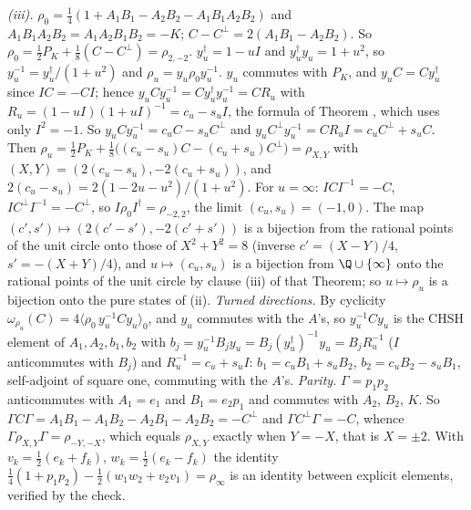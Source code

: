 \emph{(iii).} $\rho_{0} = \tfrac14(1 + A_{1}B_{1} - A_{2}B_{2} - A_{1}B_{1}A_{2}B_{2})$ and $A_{1}B_{1}A_{2}B_{2} = A_{1}A_{2}B_{1}B_{2} = -K$; $C - C^{\perp} = 2(A_{1}B_{1} - A_{2}B_{2})$. So $\rho_{0} = \tfrac12P_{K} + \tfrac18(C - C^{\perp}) = \rho_{2,-2}$. $y_{u}^{\dagger} = 1 - uI$ and $y_{u}^{\dagger}y_{u} = 1 + u^{2}$, so $y_{u}^{-1} = y_{u}^{\dagger}/(1 + u^{2})$ and $\rho_{u} = y_{u}\rho_{0}y_{u}^{-1}$. $y_{u}$ commutes with $P_{K}$, and $y_{u}C = Cy_{u}^{\dagger}$ since $IC = -CI$; hence $y_{u}Cy_{u}^{-1} = Cy_{u}^{\dagger}y_{u}^{-1} = CR_{u}$ with $R_{u} = (1 - uI)(1 + uI)^{-1} = c_{u} - s_{u}I$, the formula of Theorem , which uses only $I^{2} = -1$. So $y_{u}Cy_{u}^{-1} = c_{u}C - s_{u}C^{\perp}$ and $y_{u}C^{\perp}y_{u}^{-1} = CR_{u}I = c_{u}C^{\perp} + s_{u}C$. Then $\rho_{u} = \tfrac12P_{K} + \tfrac18\bigl((c_{u} - s_{u})C - (c_{u} + s_{u})C^{\perp}\bigr) = \rho_{X,Y}$ with $(X, Y) = (2(c_{u} - s_{u}), -2(c_{u} + s_{u}))$, and $2(c_{u} - s_{u}) = 2(1 - 2u - u^{2})/(1 + u^{2})$. For $u = \infty$: $ICI^{-1} = -C$, $IC^{\perp}I^{-1} = -C^{\perp}$, so $I\rho_{0}I^{\dagger} = \rho_{-2,2}$, the limit $(c_{u}, s_{u}) = (-1, 0)$. The map $(c', s') \mapsto (2(c' - s'), -2(c' + s'))$ is a bijection from the rational points of the unit circle onto those of $X^{2} + Y^{2} = 8$ (inverse $c' = (X - Y)/4$, $s' = -(X + Y)/4$), and $u \mapsto (c_{u}, s_{u})$ is a bijection from $\Q \cup \{\infty\}$ onto the rational points of the unit circle by clause (iii) of that Theorem; so $u \mapsto \rho_{u}$ is a bijection onto the pure states of (ii). \emph{Turned directions.} By cyclicity $\omega_{\rho_{u}}(C) = 4\langle\rho_{0}\,y_{u}^{-1}Cy_{u}\rangle_{0}$, and $y_{u}$ commutes with the $A$'s, so $y_{u}^{-1}Cy_{u}$ is the CHSH element of $A_{1}, A_{2}, b_{1}, b_{2}$ with $b_{j} = y_{u}^{-1}B_{j}y_{u} = B_{j}(y_{u}^{\dagger})^{-1}y_{u} = B_{j}R_{u}^{-1}$ ($I$ anticommutes with $B_{j}$) and $R_{u}^{-1} = c_{u} + s_{u}I$: $b_{1} = c_{u}B_{1} + s_{u}B_{2}$, $b_{2} = c_{u}B_{2} - s_{u}B_{1}$, self-adjoint of square one, commuting with the $A$'s. \emph{Parity.} $\Gamma = p_{1}p_{2}$ anticommutes with $A_{1} = e_{1}$ and $B_{1} = e_{2}p_{1}$ and commutes with $A_{2}$, $B_{2}$, $K$. So $\Gamma C\Gamma = A_{1}B_{1} - A_{1}B_{2} - A_{2}B_{1} - A_{2}B_{2} = -C^{\perp}$ and $\Gamma C^{\perp}\Gamma = -C$, whence $\Gamma\rho_{X,Y}\Gamma = \rho_{-Y,-X}$, which equals $\rho_{X,Y}$ exactly when $Y = -X$, that is $X = \pm 2$. With $v_{k} = \tfrac12(e_{k} + f_{k})$, $w_{k} = \tfrac12(e_{k} - f_{k})$ the identity $\tfrac14(1 + p_{1}p_{2}) - \tfrac12(w_{1}w_{2} + v_{2}v_{1}) = \rho_{\infty}$ is an identity between explicit elements, verified by the check.

